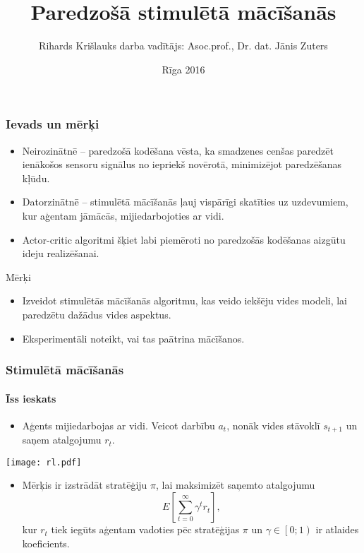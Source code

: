 \documentclass[xetex,mathserif]{beamer}
\title{Paredzošā stimulētā mācīšanās}
\author{Rihards Krišlauks \newline \small{darba vadītājs: Asoc.prof., Dr. dat. Jānis Zuters}}
\date{Rīga 2016}
\begin{document}
  \frame{\titlepage}
  \begin{frame}
    \frametitle{Ievads un mērķi}
    \begin{itemize} 
    \item Neirozinātnē -- paredzošā kodēšana vēsta, ka smadzenes cenšas
      paredzēt ienākošos sensoru signālus no iepriekš novērotā, minimizējot
      paredzēšanas kļūdu.
    \item Datorzinātnē -- stimulētā mācīšanās ļauj vispārīgi skatīties uz
      uzdevumiem, kur aģentam jāmācās, mijiedarbojoties ar vidi. 
    \item Actor-critic algoritmi šķiet labi piemēroti no paredzošās kodēšanas
      aizgūtu ideju realizēšanai.
    \end{itemize}
    \vspace{0.5cm}
    Mērķi
    \begin{itemize} 
    \item Izveidot stimulētās mācīšanās algoritmu, kas veido iekšēju vides
      modeli, lai paredzētu dažādus vides aspektus.
    \item Eksperimentāli noteikt, vai tas paātrina mācīšanos.
    \end{itemize}
  \end{frame}


  \begin{frame}
    \frametitle{Stimulētā mācīšanās}
    \framesubtitle{Īss ieskats}
    \begin{itemize}
      \item Aģents mijiedarbojas ar vidi. Veicot darbību $a_t$, nonāk vides
        stāvoklī $s_{t+1}$ un saņem atalgojumu $r_{t}$.
    \end{itemize}
    \begin{center}
      \texttt{[image: rl.pdf]}
    \end{center}
    \begin{itemize}
      \item Mērķis ir izstrādāt stratēģiju $\pi$, lai maksimizēt saņemto atalgojumu
        \[
          E\left[\sum_{t=0}^{\infty}\gamma^t r_t\right],
        \]
        kur $r_t$ tiek iegūts aģentam vadoties pēc stratēģijas $\pi$ un $\gamma \in
    \left[0; 1\right)$ ir atlaides koeficients.
    \end{itemize}
    
  \end{frame}
  
\end{document}
